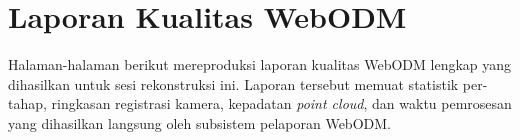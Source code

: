 \documentclass[11pt,a4paper]{article}
\begin{document}
\appendix
\section{Laporan Kualitas WebODM}\label{app:webodm}

Halaman-halaman berikut mereproduksi laporan kualitas WebODM lengkap yang dihasilkan untuk sesi rekonstruksi ini. Laporan tersebut memuat statistik per-tahap, ringkasan registrasi kamera, kepadatan \textit{point cloud}, dan waktu pemrosesan yang dihasilkan langsung oleh subsistem pelaporan WebODM.


\end{document}
